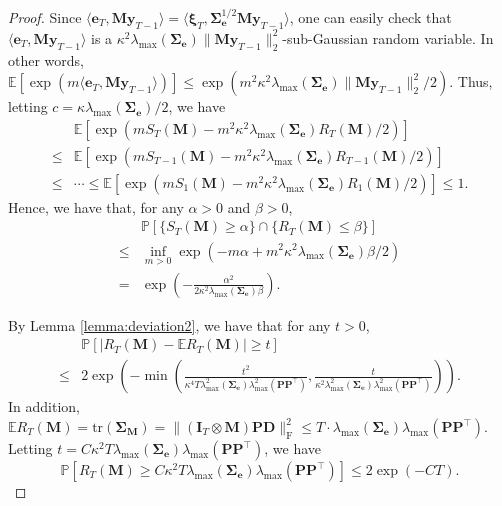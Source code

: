 \documentclass[12pt]{article}
\newcommand{\bm}{\boldsymbol}
\begin{document}
\begin{proof}
	Since $\langle\bm{e}_T,\bm{M}\bm{y}_{T-1}\rangle=\langle\bm{\xi}_T,\bm{\Sigma}_{\bm{e}}^{1/2}\bm{M}\bm{y}_{T-1}\rangle$, one can easily check that $\langle\bm{e}_T,\bm{M}\bm{y}_{T-1}\rangle$ is a $\kappa^2\lambda_{\max}(\bm{\Sigma}_{\bm{e}})\|\bm{M}\bm{y}_{T-1}\|_2^2$-sub-Gaussian random variable. In other words, $\mathbb{E}[\exp(m\langle\bm{e}_T,\bm{M}\bm{y}_{T-1}\rangle)]\leq\exp(m^2\kappa^2\lambda_{\max}(\bm{\Sigma}_{\bm{e}})\|\bm{M}\bm{y}_{T-1}\|_2^2/2)$.
	Thus, letting $c=\kappa\lambda_{\max}(\bm{\Sigma}_{\bm{e}})/2$, we have
	\begin{equation}
	\begin{split}
	&\mathbb{E}[\exp(mS_T(\bm{M})-m^2\kappa^2\lambda_{\max}(\bm{\Sigma}_{\bm{e}})R_T(\bm{M})/2)]\\
	\leq&\mathbb{E}[\exp(mS_{T-1}(\bm{M})-m^2\kappa^2\lambda_{\max}(\bm{\Sigma}_{\bm{e}})R_{T-1}(\bm{M})/2)]\\
	\leq&\cdots\leq\mathbb{E}[\exp(mS_1(\bm{M})-m^2\kappa^2\lambda_{\max}(\bm{\Sigma}_{\bm{e}})R_1(\bm{M})/2)]\leq1.
	\end{split}
	\end{equation}
	Hence, we have that, for any $\alpha>0$ and $\beta>0$,
	\begin{equation}
	\label{eq:martingale_deviation}
	\begin{split}
	&\mathbb{P}[\{S_T(\bm{M})\geq\alpha\}\cap\{R_T(\bm{M})\leq\beta\}]\\
	\leq&\inf_{m>0}\exp(-m\alpha+m^2\kappa^2\lambda_{\max}(\bm{\Sigma}_{\bm{e}})\beta/2)\\
	=&\exp\left(-\frac{\alpha^2}{2\kappa^2\lambda_{\max}(\bm{\Sigma}_{\bm{e}})\beta}\right).
	\end{split}
	\end{equation}
	
	By Lemma \ref{lemma:deviation2}, we have that for any $t>0$,
	\begin{equation}
	\begin{split}
	&\mathbb{P}[|R_T(\bm{M})-\mathbb{E}R_T(\bm{M})|\geq t]\\
	\leq&2\exp\left(-\min\left(\frac{t^2}{\kappa^4T\lambda_{\max}^2(\bm{\Sigma_e})\lambda_{\max}^2(\bm{PP}^\top)},\frac{t}{\kappa^2\lambda_{\max}^2(\bm{\Sigma_e})\lambda_{\max}^2(\bm{PP}^\top)}\right)\right).
	\end{split}
	\end{equation}
	In addition, $\mathbb{E}R_T(\bm{M})=\text{tr}(\bm{\Sigma_M})=\|(\bm{I}_T\otimes\bm{M})\bm{P}\bm{D}\|_{\text{F}}^2\leq T\cdot\lambda_{\max}(\bm{\Sigma_e})\lambda_{\max}(\bm{P}\bm{P}^\top)$. Letting $t=C\kappa^2T\lambda_{\max}(\bm{\Sigma_e})\lambda_{\max}(\bm{P}\bm{P}^\top)$, we have
	\begin{equation}
	\mathbb{P}[R_T(\bm{M})\geq C\kappa^2T\lambda_{\max}(\bm{\Sigma_e})\lambda_{\max}(\bm{P}\bm{P}^\top)]\leq2\exp(-CT).
	\end{equation}
	

\end{proof}
\end{document}
